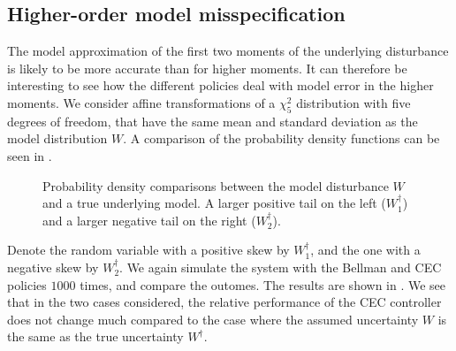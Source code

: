 \documentclass[main.tex]{subfiles}
\begin{document}
\subsection{Higher-order model misspecification}
The model approximation of the first two moments of the underlying
disturbance is likely to be more accurate than for higher moments.
It can therefore be interesting to see how the different
policies deal with model error in the higher moments.
We consider affine transformations of a $\chi^2_5$ distribution with five degrees of
freedom, that have the same mean and standard deviation as the model
distribution $W$. A comparison of the probability density
functions can be seen in .
\begin{figure}[htbp]
  \centering
  \begin{subfigure}[b]{0.5\textwidth}
  \end{subfigure}%
  \begin{subfigure}[b]{0.5\textwidth}
  \end{subfigure}
  \caption{Probability density comparisons between
    the model disturbance $W$ and a true underlying
    model. A larger positive tail on the left ($W_1^\dagger$) and
    a larger negative tail on the right ($W_2^\dagger$).
  }\label{fig:chisq_transformed}
\end{figure}
Denote the random variable with a positive skew by $W_1^\dagger$, and
the one with a negative skew by $W_2^\dagger$.
We again simulate the system with the Bellman and CEC policies $1000$
times, and compare the outomes. The results are shown in
. We see that in the two cases considered,
the relative performance of the CEC controller does not change much
compared to the case where the assumed uncertainty $W$ is the same as
the true uncertainty $W^\dagger$.
\end{document}
